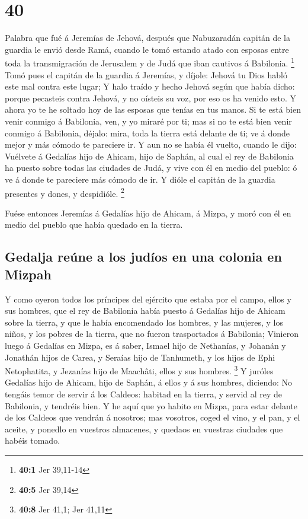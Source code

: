 \hypertarget{section-39}{%
\section{40}\label{section-39}}

 Palabra que fué á Jeremías de Jehová, después que
Nabuzaradán capitán de la guardia le envió desde Ramá, cuando le tomó
estando atado con esposas entre toda la transmigración de Jerusalem y de
Judá que iban cautivos á Babilonia. \footnote{\textbf{40:1} Jer 39,11-14}
 Tomó pues el capitán de la guardia á Jeremías, y díjole:
Jehová tu Dios habló este mal contra este lugar;  Y halo
traído y hecho Jehová según que había dicho: porque pecasteis contra
Jehová, y no oísteis su voz, por eso os ha venido esto.  Y
ahora yo te he soltado hoy de las esposas que tenías en tus manos. Si te
está bien venir conmigo á Babilonia, ven, y yo miraré por ti; mas si no
te está bien venir conmigo á Babilonia, déjalo: mira, toda la tierra
está delante de ti; ve á donde mejor y más cómodo te pareciere ir.
 Y aun no se había él vuelto, cuando le dijo: Vuélvete á
Gedalías hijo de Ahicam, hijo de Saphán, al cual el rey de Babilonia ha
puesto sobre todas las ciudades de Judá, y vive con él en medio del
pueblo: ó ve á donde te pareciere más cómodo de ir. Y dióle el capitán
de la guardia presentes y dones, y despidióle. \footnote{\textbf{40:5}
  Jer 39,14}

 Fuése entonces Jeremías á Gedalías hijo de Ahicam, á Mizpa,
y moró con él en medio del pueblo que había quedado en la tierra.

\hypertarget{gedalja-reuxfane-a-los-juduxedos-en-una-colonia-en-mizpah}{%
\subsection{Gedalja reúne a los judíos en una colonia en
Mizpah}\label{gedalja-reuxfane-a-los-juduxedos-en-una-colonia-en-mizpah}}

 Y como oyeron todos los príncipes del ejército que estaba
por el campo, ellos y sus hombres, que el rey de Babilonia había puesto
á Gedalías hijo de Ahicam sobre la tierra, y que le había encomendado
los hombres, y las mujeres, y los niños, y los pobres de la tierra, que
no fueron trasportados á Babilonia;  Vinieron luego á
Gedalías en Mizpa, es á saber, Ismael hijo de Nethanías, y Johanán y
Jonathán hijos de Carea, y Seraías hijo de Tanhumeth, y los hijos de
Ephi Netophatita, y Jezanías hijo de Maachâti, ellos y sus hombres.
\footnote{\textbf{40:8} Jer 41,1; Jer 41,11}  Y juróles
Gedalías hijo de Ahicam, hijo de Saphán, á ellos y á sus hombres,
diciendo: No tengáis temor de servir á los Caldeos: habitad en la
tierra, y servid al rey de Babilonia, y tendréis bien.  Y
he aquí que yo habito en Mizpa, para estar delante de los Caldeos que
vendrán á nosotros; mas vosotros, coged el vino, y el pan, y el aceite,
y ponedlo en vuestros almacenes, y quedaos en vuestras ciudades que
habéis tomado.

